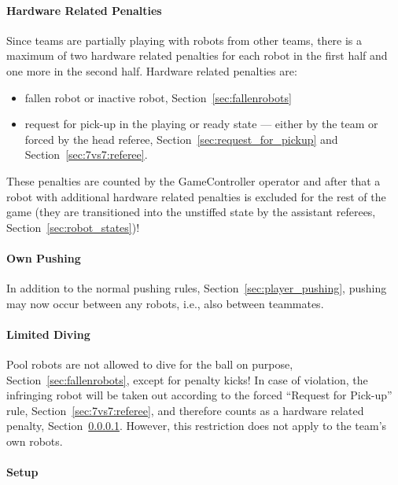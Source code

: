         \paragraph{Hardware Related Penalties}
            \label{sec:7vs7:hardware_related_penalties}
            Since teams are partially playing with robots from other teams, there is a maximum of two hardware related penalties for each robot in the first half and one more in the second half.
            Hardware related penalties are:
            \begin{itemize}
                \item fallen robot or inactive robot, \cf Section~\ref{sec:fallenrobots}
                \item request for pick-up in the playing or ready state — either by the team or forced by the head referee, \cf Section~\ref{sec:request_for_pickup} and Section~\ref{sec:7vs7:referee}.
            \end{itemize}
            These penalties are counted by the GameController operator and after that a robot with additional hardware related penalties is excluded for the rest of the game (they are transitioned into the unstiffed state by the assistant referees, \cf Section~\ref{sec:robot_states})!

        \paragraph{Own Pushing}
            In addition to the normal pushing rules, \cf Section~\ref{sec:player_pushing}, pushing may now occur between any robots, i.e., also between teammates.

        \paragraph{Limited Diving}
            Pool robots are not allowed to dive for the ball on purpose, \cf Section~\ref{sec:fallenrobots}, except for penalty kicks! In case of violation, the infringing robot will be taken out according to the forced ``Request for Pick-up'' rule, \cf Section~\ref{sec:7vs7:referee}, and therefore counts as a hardware related penalty, \cf Section~\ref{sec:7vs7:hardware_related_penalties}. However, this restriction does not apply to the team's own robots.

        \paragraph{Setup}
            

